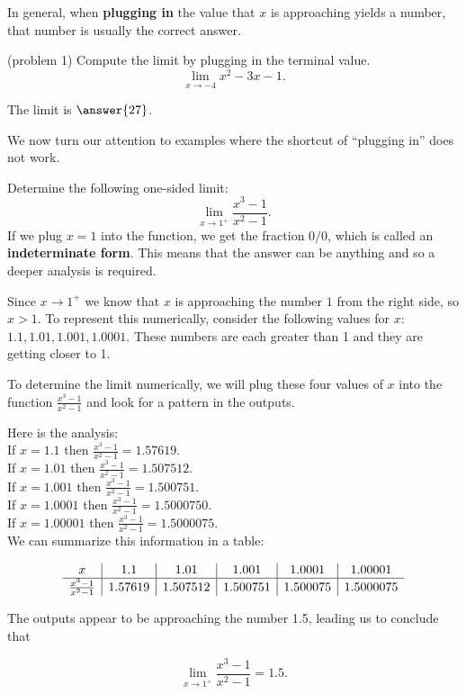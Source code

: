 \documentclass[handout]{ximera}
\begin{document}
In general, when \textbf{plugging in} the value that $x$ is approaching yields a number, 
that number is usually the correct answer.  



\begin{problem}(problem 1)
Compute the limit by plugging in the terminal value.
\[
\lim_{x \to -4} x^2 -3x -1.
\]

The limit is $\answer{27}$.
\end{problem}

We now turn our attention to examples where the shortcut of ``plugging in'' does not work.

\begin{example}[example 2]
Determine the following one-sided limit: 
\[\lim_{x \to 1^{+}} \frac{x^3 - 1}{x^2 -1}.\]
If we plug $x = 1$ into the function, we get the fraction  $0/0$, which is called an \textbf{indeterminate form}. 
This means that the answer can be anything and so a deeper analysis is required.


Since  $x \to 1^{+}$ we know that $x$ is approaching the number $1$ from the right side, so $x > 1$. 
To represent this numerically, consider the following values for $x$: $1.1, 1.01, 1.001, 1.0001$.
These numbers are each greater than 1 and they are getting closer to 1.
 
To determine the limit numerically,  we will plug these four values of $x$ into the function $\frac{x^3 - 1}{x^2-1}$ and  
look for a pattern in the outputs.

Here is the analysis:\\
If $x = 1.1$ then $\displaystyle{\frac{x^3 - 1}{x^2-1}= 1.57619}$.\\
If $x = 1.01$ then $\displaystyle{\frac{x^3 - 1}{x^2-1} = 1.507512}$.\\
If $x = 1.001$ then $\displaystyle{\frac{x^3 - 1}{x^2-1}= 1.500751}$.\\
If $x = 1.0001$ then $\displaystyle{\frac{x^3 - 1}{x^2-1}= 1.5000750}$.\\
If $x = 1.00001$ then $\displaystyle{\frac{x^3 - 1}{x^2-1}= 1.5000075}$.\\

We can summarize this information in a table:
  
\[
\begin{array}{ c | c | c | c | c | c}
  x & 1.1 & 1.01 & 1.001 & 1.0001 & 1.00001\\ 
	\hline
	\frac{x^3 - 1}{x^2-1} & 1.57619 & 1.507512 & 1.500751 & 1.500075 & 1.5000075
\end{array}
\]


The outputs appear to be approaching the number 1.5, leading us to conclude that

\[\lim_{x \to 1^+} \frac{x^3 - 1}{x^2-1} = 1.5.\] 
 
 
\end{example}
\end{document}

